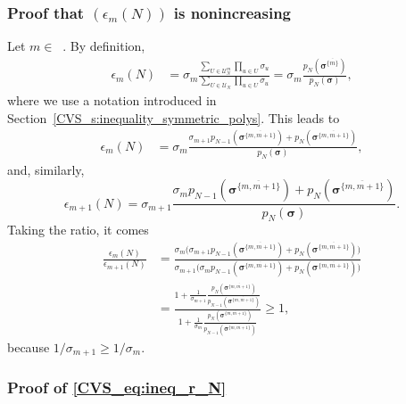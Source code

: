 \documentclass[twoside,11pt]{book}
\numberwithin{theorem}{chapter}
\numberwithin{definition}{chapter}
\numberwithin{proposition}{chapter}
\numberwithin{corollary}{chapter}
\numberwithin{example}{chapter}
\numberwithin{lemma}{chapter}
\numberwithin{assumption}{chapter}
\DeclareMathOperator{\Ns}{\mathbb{N}^{*}}
\begin{document}
\subsubsection{Proof that $(\epsilon_{m}(N))$ is nonincreasing}
\label{CVS_s:epsilon_non_increasing}
Let $m \in \Ns$. By definition,
\begin{align}
\epsilon_{m}(N) & = \sigma_{m} \frac{\sum_{U \in \mathcal{U}_{N}^{m}} \prod_{u \in U} \sigma_{u}}{\sum_{U \in \mathcal{U}_{N}} \prod_{u \in U} \sigma_{u}} = \sigma_{m} \frac{p_{N}(\bm{\sigma}^{\overline{\{m\}}})}{p_{N}(\bm{\sigma})},
\end{align}
where we use a notation introduced in Section~\ref{CVS_s:inequality_symmetric_polys}. This leads to
\begin{align}
  \epsilon_{m}(N) & = \sigma_{m} \frac{ \sigma_{m+1}p_{N-1}(\bm{\sigma}^{\overline{\{m,m+1 \}}}) + p_{N}(\bm{\sigma}^{\overline{\{m,m+1 \}}})}{p_{N}(\bm{\sigma})},
\end{align}
and, similarly,
\begin{equation}
\epsilon_{m+1}(N) = \sigma_{m+1} \frac{ \sigma_{m}p_{N-1}(\bm{\sigma}^{\overline{\{m,m+1 \}}}) + p_{N}(\bm{\sigma}^{\overline{\{m,m+1 \}}})}{p_{N}(\bm{\sigma})}.
\end{equation}
Taking the ratio, it comes
\begin{align}
\frac{\epsilon_{m}(N)}{\epsilon_{m+1}(N)} & = \frac{\sigma_{m} \bigg( \sigma_{m+1}p_{N-1}\left(\bm{\sigma}^{\overline{\{m,m+1 \}}} \right) + p_{N} \left(\bm{\sigma}^{\overline{\{m,m+1 \}}} \right)\bigg)}{\sigma_{m+1} \bigg( \sigma_{m}p_{N-1}\left(\bm{\sigma}^{\overline{\{m,m+1 \}}} \right) + p_{N} \left(\bm{\sigma}^{\overline{\{m,m+1 \}}}\right)\bigg)}\\
& = \frac{1  + \frac{1}{\sigma_{m+1}}\frac{p_{N} \left(\bm{\sigma}^{\overline{\{m,m+1 \}}} \right) }{ p_{N-1} \left(\bm{\sigma}^{\overline{\{m,m+1 \}}} \right)} }{1  + \frac{1}{\sigma_{m} }\frac{p_{N} \left(\bm{\sigma}^{\overline{\{m,m+1 \}}} \right) }{p_{N-1} \left(\bm{\sigma}^{\overline{\{m,m+1 \}}}\right)}} \geq 1,
\end{align}
because $1/\sigma_{m+1} \geq 1/\sigma_{m}$.

\subsubsection{Proof of \eqref{CVS_eq:ineq_r_N}}\label{CVS_app:proof_ineq_r_N}
\end{document}
